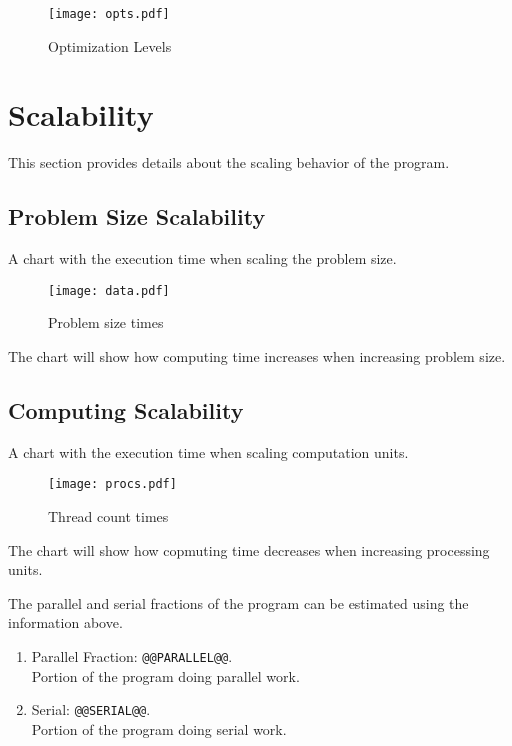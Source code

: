 \documentclass[a4paper]{article}
\begin{document}
\begin{figure}[H]
\label{fig:optimizations}
\centering
\texttt{[image: opts.pdf]}
\caption{Optimization Levels}
\end{figure}

\section{Scalability}

This section provides details about the scaling behavior of the program.

\subsection{Problem Size Scalability}

A chart with the execution time when scaling the problem size.

\begin{figure}[H]
\label{fig:scaling}
\centering
\texttt{[image: data.pdf]}
\caption{Problem size times}
\end{figure}

The chart will show how computing time increases when increasing problem size.

\subsection{Computing Scalability}

A chart with the execution time when scaling computation units.

\begin{figure}[H]
\label{fig:threads}
\centering
\texttt{[image: procs.pdf]}
\caption{Thread count times}
\end{figure}

The chart will show how copmuting time decreases when increasing processing units.

The parallel and serial fractions of the program can be estimated using the information above.

\begin{enumerate}
\item Parallel Fraction: {\tt @@PARALLEL@@}.\\Portion of the program doing parallel work.
\item Serial: {\tt @@SERIAL@@}.\\Portion of the program doing serial work.
\end{enumerate}
\end{document}
